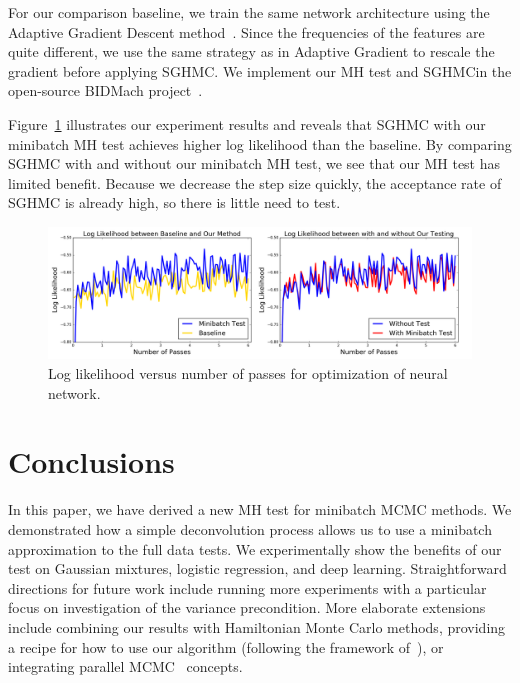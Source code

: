 \documentclass{article}
\begin{document}
For our comparison baseline, we train the same network architecture using the Adaptive Gradient
Descent method~\cite{adapGrad}. Since the frequencies of the features are quite different, we use
the same strategy as in Adaptive Gradient to rescale the gradient before applying SGHMC. We
implement our MH test and SGHMCin the open-source BIDMach project~\cite{canny2013bidmach}.  

Figure~\ref{fig:nnet_fig} illustrates our experiment results and reveals that SGHMC with our
minibatch MH test achieves higher log likelihood than the baseline. By comparing SGHMC with and
without our minibatch MH test, we see that our MH test has limited benefit. Because we decrease the
step size quickly, the acceptance rate of SGHMC is already high, so there is little need to test.

\begin{figure}[t]
    \centering
    \includegraphics[width=1\linewidth]{exp3}
    \caption{Log likelihood versus number of passes for optimization of neural network.}
    \label{fig:nnet_fig}
    \vspace{-10pt}
\end{figure}




\section{Conclusions}\label{sec:conclusion}

In this paper, we have derived a new MH test for minibatch MCMC methods. We demonstrated how a
simple deconvolution process allows us to use a minibatch approximation to the full data tests. We
experimentally show the benefits of our test on Gaussian mixtures, logistic regression, and deep
learning.  Straightforward directions for future work include running more experiments with a
particular focus on investigation of the variance precondition.  More elaborate extensions include
combining our results with Hamiltonian Monte Carlo methods, providing a recipe for how to use our
algorithm (following the framework of~\cite{sgmcmc_2015}), or integrating parallel
MCMC~\cite{conf/uai/AngelinoKWSA14,conf/icml/AhnSW14} concepts.
\end{document}
